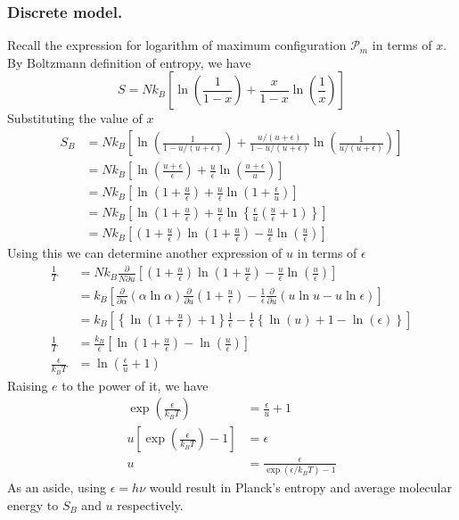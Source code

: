 \documentclass[../../../Main.tex]{subfiles}
\begin{document}
\subsubsection*{Discrete model.} Recall the expression for logarithm of maximum configuration $\mathcal{P}_m$ in terms of $x$. By Boltzmann definition of entropy, we have
\begin{equation*}
    S=Nk_B\left[\ln \left(\frac{1}{1-x}\right)+\frac{x}{1-x}\ln \left(\frac{1}{x}\right)\right]
\end{equation*} 
Substituting the value of $x$
\begin{align*}
    S_B&=Nk_B\left[\ln \left(\frac{1}{1-u/(u+\epsilon)}\right)+\frac{u/(u+\epsilon)}{1-u/(u+\epsilon)}\ln \left(\frac{1}{u/(u+\epsilon)}\right)\right]\\
    &=Nk_B\left[\ln \left(\frac{u+\epsilon}{\epsilon}\right)+\frac{u}{\epsilon}\ln \left(\frac{u+\epsilon}{u}\right)\right]\\
    &=Nk_B\left[\ln \left(1+\frac{u}{\epsilon}\right)+\frac{u}{\epsilon}\ln \left(1+\frac{\epsilon}{u}\right)\right]\\
    &=Nk_B\left[\ln \left(1+\frac{u}{\epsilon}\right)+\frac{u}{\epsilon}\ln \left\{\frac{\epsilon}{u}\left(\frac{u}{\epsilon}+1\right)\right\}\right]\\
    &=Nk_B\left[\left(1+\frac{u}{\epsilon} \right) \ln \left(1+\frac{u}{\epsilon}\right)-\frac{u}{\epsilon}\ln\left(\frac{u}{\epsilon}\right)\right]
\end{align*}  
Using this we can determine another expression of $u$ in terms of $\epsilon$
\begin{align*}
    \frac{1}{T}&=Nk_B\frac{\partial}{N\partial u}\left[\left(1+\frac{u}{\epsilon} \right) \ln \left(1+\frac{u}{\epsilon}\right)-\frac{u}{\epsilon}\ln\left(\frac{u}{\epsilon}\right)\right]\\
    &=k_B\left[\frac{\partial}{\partial \alpha}\left(\alpha\ln \alpha\right)\frac{\partial}{\partial u}\left(1+\frac{u}{\epsilon}\right)-\frac{1}{\epsilon}\frac{\partial}{\partial u}\left(u\ln u-u\ln\epsilon\right)\right]\\
    &=k_B\left[\left\{\ln\left(1+\frac{u}{\epsilon} \right)+1\right\}\frac{1}{\epsilon}-\frac{1}{\epsilon}\left\{\ln (u)+1-\ln (\epsilon)\right\}\right]\\
    \frac{1}{T}&=\frac{k_B}{\epsilon}\left[\ln\left(1+\frac{u}{\epsilon}\right)-\ln\left(\frac{u}{\epsilon}\right)\right]\\
    \frac{\epsilon}{k_BT}&=\ln\left(\frac{\epsilon}{u}+1\right)
\end{align*}
Raising $e$ to the power of it, we have 
\begin{align*}
    \exp\left(\frac{\epsilon}{k_BT}\right)&=\frac{\epsilon}{u}+1\\
    u\left[\exp\left(\frac{\epsilon}{k_BT}\right)-1\right]&=\epsilon\\
    u&=\frac{\epsilon}{\exp(\epsilon/k_BT)-1}
\end{align*}
As an aside, using $\epsilon=h\nu$ would result in Planck's entropy and average molecular energy to $S_B$ and $u$ respectively.
\end{document}
